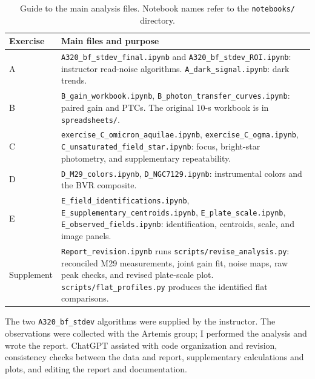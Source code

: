 \documentclass[12pt,letterpaper,twocolumn]{article}
\begin{document}
\begin{table}[h]\centering\small
\caption{Guide to the main analysis files. Notebook names refer to the \nolinkurl{notebooks/} directory.}
\begin{tabularx}{\textwidth}{@{}lX@{}}\toprule
Exercise & Main files and purpose\\\midrule
A & \nolinkurl{A320_bf_stdev_final.ipynb} and \nolinkurl{A320_bf_stdev_ROI.ipynb}: instructor read-noise algorithms. \nolinkurl{A_dark_signal.ipynb}: dark trends.\\
B & \nolinkurl{B_gain_workbook.ipynb}, \nolinkurl{B_photon_transfer_curves.ipynb}: paired gain and PTCs. The original 10-s workbook is in \nolinkurl{spreadsheets/}.\\
C & \nolinkurl{exercise_C_omicron_aquilae.ipynb}, \nolinkurl{exercise_C_ogma.ipynb}, \nolinkurl{C_unsaturated_field_star.ipynb}: focus, bright-star photometry, and supplementary repeatability.\\
D & \nolinkurl{D_M29_colors.ipynb}, \nolinkurl{D_NGC7129.ipynb}: instrumental colors and the BVR composite.\\
E & \nolinkurl{E_field_identifications.ipynb}, \nolinkurl{E_supplementary_centroids.ipynb}, \nolinkurl{E_plate_scale.ipynb}, \nolinkurl{E_observed_fields.ipynb}: identification, centroids, scale, and image panels.\\
Supplement & \nolinkurl{Report_revision.ipynb} runs \nolinkurl{scripts/revise_analysis.py}: reconciled M29 measurements, joint gain fit, noise maps, raw peak checks, and revised plate-scale plot. \nolinkurl{scripts/flat_profiles.py} produces the identified flat comparisons.\\\bottomrule
\end{tabularx}\end{table}

The two \nolinkurl{A320_bf_stdev} algorithms were supplied by the
instructor. The observations were collected with the Artemis group;
I performed the analysis and wrote the report. ChatGPT assisted with code organization and revision,
consistency checks between the data and report, supplementary calculations
and plots, and editing the report and documentation.
\end{document}
